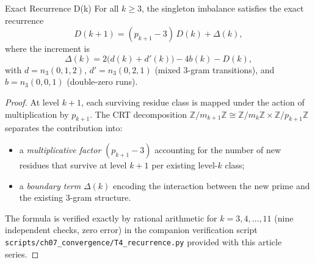 \documentclass[12pt,a4paper]{article}
\begin{document}
\begin{thmbox}{Exact Recurrence D(k)}
\label{thm:recurrence}
For all $k \geq 3$, the singleton imbalance satisfies the exact recurrence
\begin{equation}
  D(k+1) = (p_{k+1} - 3)\,D(k) + \Delta(k),
  \label{eq:recurrence_D}
\end{equation}
where the increment is
\begin{equation}
  \Delta(k) = 2\bigl(d(k) + d'(k)\bigr) - 4b(k) - D(k),
  \label{eq:Delta}
\end{equation}
with $d = n_3(0,1,2)$, $d' = n_3(0,2,1)$ (mixed 3-gram transitions),
and $b = n_3(0,0,1)$ (double-zero runs).

\begin{proof}
At level $k+1$, each surviving residue class is mapped under the
action of multiplication by $p_{k+1}$. The CRT decomposition
$\mathbb{Z}/m_{k+1}\mathbb{Z} \cong \mathbb{Z}/m_k\mathbb{Z}
\times \mathbb{Z}/p_{k+1}\mathbb{Z}$ separates the contribution
into:
\begin{itemize}[nosep]
\item a \emph{multiplicative factor} $(p_{k+1} - 3)$ accounting for
  the number of new residues that survive at level $k+1$ per
  existing level-$k$ class;
\item a \emph{boundary term} $\Delta(k)$ encoding the interaction
  between the new prime and the existing 3-gram structure.
\end{itemize}
The formula is verified exactly by rational arithmetic for
$k = 3, 4, \ldots, 11$ (nine independent checks, zero error)
in the companion verification script
\texttt{scripts/ch07\_convergence/T4\_recurrence.py}
provided with this article series.
\end{proof}
\end{thmbox}
\end{document}
